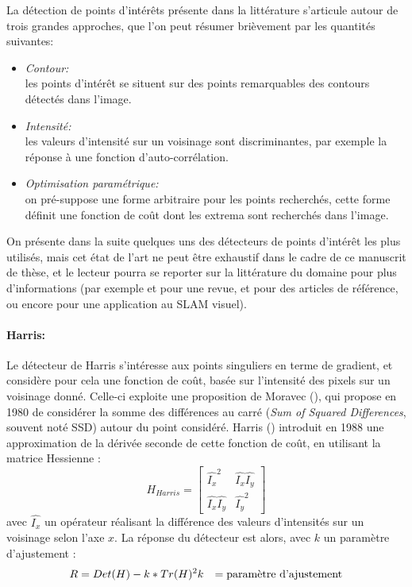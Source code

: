 La détection de points d'intérêts présente dans la littérature s'articule autour de trois grandes approches, que l'on peut résumer brièvement par les quantités suivantes: 
\begin{itemize}
	\item{\emph{Contour:\\}} 
	les points d'intérêt se situent sur des points remarquables des contours détectés dans l'image. \\

	\item{\emph{Intensité:\\}}
	les valeurs d'intensité sur un voisinage sont discriminantes, par exemple la réponse à une fonction d'auto-corrélation.\\

	\item{\emph{Optimisation paramétrique:\\}}
	on pré-suppose une forme arbitraire pour les points recherchés, cette forme définit une fonction de coût dont les extrema sont recherchés dans l'image.\\
\end{itemize} 

On présente dans la suite quelques uns des détecteurs de points d'intérêt les plus utilisés, mais cet état de l'art ne peut être exhaustif dans le cadre de ce manuscrit de thèse, et le lecteur pourra se reporter sur la littérature du domaine pour plus d'informations (par exemple \cite{Tuytelaars2007} et \cite{Schmid2000} pour une revue, \cite{Shi2002} \cite{Bay} \cite{Lowe1999a} et \cite{Rosten} pour des articles de référence, ou encore \cite{Sood2008} pour une application au SLAM visuel). 

\paragraph{Harris:\\}
Le détecteur de Harris s'intéresse aux points singuliers en terme de gradient, et considère pour cela une fonction de coût, basée sur l'intensité des pixels sur un voisinage donné. Celle-ci exploite une proposition de Moravec (\cite{Moravec1980}), qui propose en 1980 de considérer la somme des différences au carré (\emph{Sum of Squared Differences}, souvent noté SSD) autour du point considéré. Harris (\cite{Harris1988}) introduit en 1988 une approximation de la dérivée seconde de cette fonction de coût, en utilisant la matrice Hessienne :
\begin{equation} \label{eq:ch3_Harris_H}
	H_{Harris} = \left[ 
		\begin{array}{cc}
		\widehat{I_x}^2 & \widehat{I_x} \widehat{I_y} \\
		\widehat{I_x} \widehat{I_y} & \widehat{I_y}^2  
		\end{array} 
	\right]
\end{equation}
avec $\widehat{I_x}$ un opérateur réalisant la différence des valeurs d'intensités sur un voisinage selon l'axe $x$. La réponse du détecteur est alors, avec $k$ un paramètre d'ajustement :
\begin{align}
	R &= Det(H) - k*Tr(H)^2
	k &= \textnormal{paramètre d'ajustement}
\end{align}

